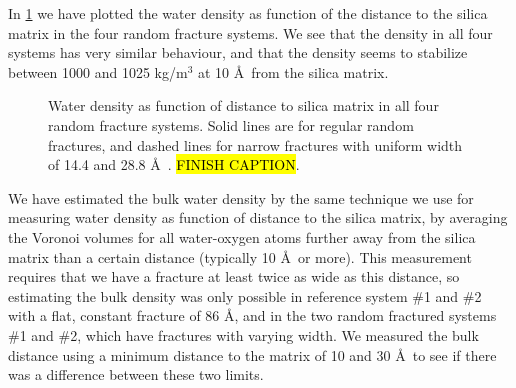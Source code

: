 In \cref{fig:density_rough_systems} we have plotted the water density as function of the distance to the silica matrix in the four random fracture systems. We see that the density in all four systems has very similar behaviour, and that the density seems to stabilize between 1000 and 1025 kg/m$^3$ at 10 \AA\ from the silica matrix.%
%
%
\begin{figure}[htpb]%
    \begin{minipage}[t]{0.499\textwidth}%
        \captionsetup{width=0.925\textwidth}%
        \centering%
        \caption{%
            Water density as function of distance to silica matrix in all four reference systems (all are flat pores). Solid lines are for 86 \AA\ wide pores and dashed lines for 14.4 and 28.8 \AA\ wide pores.\hl{FINISH CAPTION}. %
            \label{fig:density_reference_systems}%
        }%
    \end{minipage}%
    \hfill%
    \begin{minipage}[t]{0.499\textwidth}%
        \captionsetup{width=0.925\textwidth}%
        \centering%
        \caption{%
            Water density as function of distance to silica matrix in all four random fracture systems. Solid lines are for regular random fractures, and dashed lines for narrow fractures with uniform width of 14.4 and 28.8 \AA\ . \hl{FINISH CAPTION}. %
            \label{fig:density_rough_systems}%
        }%
    \end{minipage}%
\end{figure}%

We have estimated the bulk water density by the same technique we use for measuring water density as function of distance to the silica matrix, by averaging the Voronoi volumes for all water-oxygen atoms further away from the silica matrix than a certain distance (typically 10 \AA\ or more). This measurement requires that we have a fracture at least twice as wide as this distance, so estimating the bulk density was only possible in reference system \#1 and \#2 with a flat, constant fracture of 86 \AA, and in the two random fractured systems \#1 and \#2, which have fractures with varying width. We measured the bulk distance using a minimum distance to the matrix of 10 and 30 \AA\, to see if there was a difference between these two limits.

